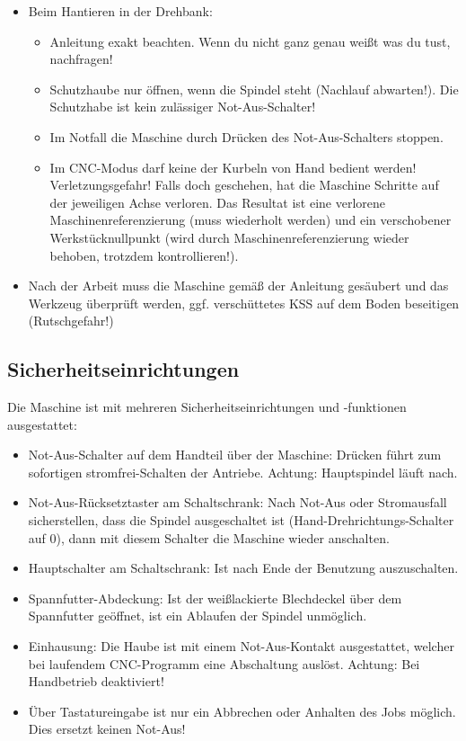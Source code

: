 \documentclass{\basedir/fablab-document}
\begin{document}
\begin{itemize}
 \item Beim Hantieren in der Drehbank:
\begin{itemize}
 \item Anleitung exakt beachten. Wenn du nicht ganz genau weißt was du tust, nachfragen!
 \item Schutzhaube nur öffnen, wenn die Spindel steht (Nachlauf abwarten!). Die Schutzhabe ist kein zulässiger Not-Aus-Schalter!
\item Im Notfall die Maschine durch Drücken des Not-Aus-Schalters stoppen.
\item Im CNC-Modus darf keine der Kurbeln von Hand bedient werden! Verletzungsgefahr! Falls doch geschehen, hat die Maschine Schritte auf der jeweiligen Achse verloren. Das Resultat ist eine verlorene Maschinenreferenzierung (muss wiederholt werden) und ein verschobener Werkstücknullpunkt (wird durch Maschinenreferenzierung wieder behoben, trotzdem kontrollieren!).
\end{itemize}
\item Nach der Arbeit muss die Maschine gemäß der Anleitung gesäubert und das Werkzeug überprüft werden, ggf. verschüttetes KSS auf dem Boden beseitigen (Rutschgefahr!)

\end{itemize}
\subsection{Sicherheitseinrichtungen}
Die Maschine ist mit mehreren Sicherheitseinrichtungen und -funktionen ausgestattet:
\begin{itemize}
	\item Not-Aus-Schalter auf dem Handteil über der Maschine: Drücken führt zum sofortigen stromfrei-Schalten der Antriebe. Achtung: Hauptspindel läuft nach.
	\item Not-Aus-Rücksetztaster am Schaltschrank: Nach Not-Aus oder Stromausfall sicherstellen, dass die Spindel ausgeschaltet ist (Hand-Drehrichtungs-Schalter auf 0), dann mit diesem Schalter die Maschine wieder anschalten.
	\item Hauptschalter am Schaltschrank: Ist nach Ende der Benutzung auszuschalten.
	\item Spannfutter-Abdeckung: Ist der weißlackierte Blechdeckel über dem Spannfutter geöffnet, ist ein Ablaufen der Spindel unmöglich.
	\item Einhausung: Die Haube ist mit einem Not-Aus-Kontakt ausgestattet, welcher bei laufendem CNC-Programm eine Abschaltung auslöst. Achtung: Bei Handbetrieb deaktiviert!
	\item Über Tastatureingabe ist nur ein Abbrechen oder Anhalten des Jobs möglich. Dies ersetzt keinen Not-Aus!
\end{itemize}
\end{document}
